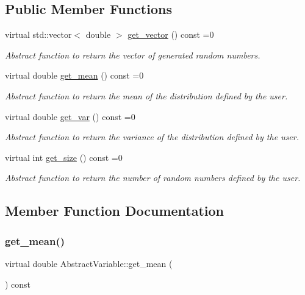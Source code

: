 \subsection*{Public Member Functions}
\begin{DoxyCompactItemize}
\item 
virtual std\+::vector$<$ double $>$ \hyperlink{classAbstractVariable_a0312a988d8c527d2af7615ef2fd08621}{get\+\_\+vector} () const =0
\begin{DoxyCompactList}\small\item\em Abstract function to return the vector of generated random numbers. \end{DoxyCompactList}\item 
virtual double \hyperlink{classAbstractVariable_a99ceeeecc689a9683badfdfa7ef20c45}{get\+\_\+mean} () const =0
\begin{DoxyCompactList}\small\item\em Abstract function to return the mean of the distribution defined by the user. \end{DoxyCompactList}\item 
virtual double \hyperlink{classAbstractVariable_a71d378332b0e5b3c1760bb98db5d906b}{get\+\_\+var} () const =0
\begin{DoxyCompactList}\small\item\em Abstract function to return the variance of the distribution defined by the user. \end{DoxyCompactList}\item 
virtual int \hyperlink{classAbstractVariable_a96d9b63c3d9aff4673a9c66738302766}{get\+\_\+size} () const =0
\begin{DoxyCompactList}\small\item\em Abstract function to return the number of random numbers defined by the user. \end{DoxyCompactList}\end{DoxyCompactItemize}


\subsection{Member Function Documentation}
\mbox{\label{classAbstractVariable_a99ceeeecc689a9683badfdfa7ef20c45}} 
\subsubsection{\texorpdfstring{get\+\_\+mean()}{get\_mean()}}
{\footnotesize\ttfamily virtual double Abstract\+Variable\+::get\+\_\+mean (\begin{DoxyParamCaption}{ }\end{DoxyParamCaption}) const\hspace{0.3cm}{\ttfamily [pure virtual]}}



